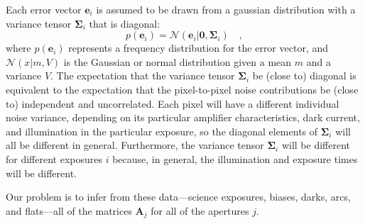 \documentclass[12pt]{article}
\newcommand{\hmatrix}[1]{\boldsymbol{#1}}
\newcommand{\Amatrix}{\hmatrix{A}}
\newcommand{\zero}{\hmatrix{0}}
\newcommand{\error}{\hmatrix{e}}
\newcommand{\pixelvariance}{\hmatrix{\Sigma}}
\newcommand{\Normal}{\mathscr{N}}
\begin{document}
Each error vector $\error_i$ is assumed to be drawn from a gaussian
distribution with a variance tensor $\pixelvariance_i$ that is
diagonal:
\begin{equation}
p(\error_i) =\Normal(\error_i|\zero,\pixelvariance_i) \quad,
\end{equation}
where $p(\error_i)$ represents a frequency distribution for the error
vector, and $\Normal(x|m,V)$ is the Gaussian or normal distribution
given a mean $m$ and a variance $V$.  The expectation that the
variance tensor $\pixelvariance_i$ be (close to) diagonal is
equivalent to the expectation that the pixel-to-pixel noise
contributions be (close to) independent and uncorrelated.  Each pixel
will have a different individual noise variance, depending on its
particular amplifier characteristics, dark current, and illumination
in the particular exposure, so the diagonal elements of
$\pixelvariance_i$ will all be different in general.  Furthermore, the
variance tensor $\pixelvariance_i$ will be different for different
exposures $i$ because, in general, the illumination and exposure times
will be different.

Our problem is to infer from these data---science exposures, biases,
darks, arcs, and flats---all of the matrices $\Amatrix_j$ for all of
the apertures $j$.
\end{document}
